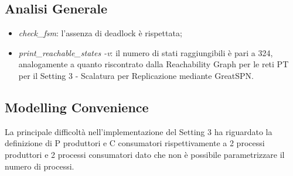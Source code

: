 \documentclass{article}
\begin{document}
\subsection{Analisi Generale}
    \begin{itemize}
        \item \textit{check\_fsm}: l'assenza di deadlock è rispettata;
        \item \textit{print\_reachable\_states -v}: il numero di stati raggiungibili è pari a 324, analogamente a quanto riscontrato dalla Reachability Graph per le reti PT per il Setting 3 - Scalatura per Replicazione mediante GreatSPN.
    \end{itemize}
\subsection{Modelling Convenience}
La principale difficoltà nell'implementazione del Setting 3 ha riguardato la definizione di P produttori e C consumatori rispettivamente a 2 processi produttori e 2 processi consumatori dato che non è possibile parametrizzare il numero di processi.
\end{document}
